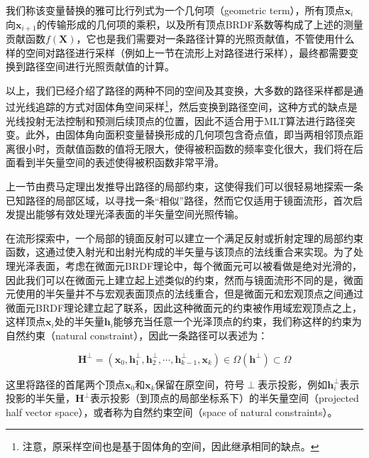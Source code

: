 \noindent 我们称该变量替换的雅可比行列式为一个几何项（geometric term），所有顶点$\mathbf{x}_i$向$\mathbf{x}_{i+1}$的传输形成的几何项的乘积，以及所有顶点BRDF系数等构成了上述的测量贡献函数$f(\mathbf{X})$，它也是我们需要对一条路径计算的光照贡献值，不管使用什么样的空间对路径进行采样（例如上一节在流形上对路径进行采样），最终都需要变换到路径空间进行光照贡献值的计算。

以上，我们已经介绍了路径的两种不同的空间及其变换，大多数的路径采样都是通过光线追踪的方式对固体角空间采样\footnote{注意，原采样空间也是基于固体角的空间，因此继承相同的缺点。}，然后变换到路径空间，这种方式的缺点是光线投射无法控制和预测后续顶点的位置，因此不适合用于MLT算法进行路径突变。此外，由固体角向面积变量替换形成的几何项包含奇点值，即当两相邻顶点距离很小时，贡献值函数的值将无限大，使得被积函数的频率变化很大，我们将在后面看到半矢量空间的表述使得被积函数非常平滑。

上一节由费马定理出发推导出路径的局部约束，这使得我们可以很轻易地探索一条已知路径的局部区域，以寻找一条“相似”路径，然而它仅适用于镜面流形，\cite{a:TheNaturalConstraintRepresentationofthePathSpaceforEfficientLightTransportSimulation}首次启发提出能够有效处理光泽表面的半矢量空间光照传输。

在流形探索中，一个局部的镜面反射可以建立一个满足反射或折射定理的局部约束函数，这通过使入射光和出射光构成的半矢量与该顶点的法线重合来实现。为了处理光泽表面，考虑在微面元BRDF理论中，每个微面元可以被看做是绝对光滑的，因此我们可以在微面元上建立起上述类似的约束，然而与镜面流形不同的是，微面元使用的半矢量并不与宏观表面顶点的法线重合，但是微面元和宏观顶点之间通过微面元BRDF理论建立起了联系，因此这种微面元的约束被作用域宏观顶点之上，这样顶点$\mathbf{x}_i$处的半矢量$\mathbf{h}_i$能够充当任意一个光泽顶点的约束，我们称这样的约束为自然约束（natural constraint），因此一条路径可以表述为：

\begin{equation}\label{e:mlt-half-vector-space}
	\mathbf{H}^{\perp}=(\mathbf{x}_0,\mathbf{h}^{\perp}_1,\mathbf{h}^{\perp}_2,\cdots,\mathbf{h}^{\perp}_{k-1},\mathbf{x}_k)\in\Omega(\mathbf{h}^{\perp})\subset\Omega
\end{equation}

\noindent 这里将路径的首尾两个顶点$\mathbf{x}_0$和$\mathbf{x}_k$保留在原空间，符号$\perp$表示投影，例如$\mathbf{h}^{\perp}_i$表示投影的半矢量，$\mathbf{H}^{\perp}$表示投影（到顶点的局部坐标系下）的半矢量空间（projected half vector space），或者称为自然约束空间（space of natural constraints）。


